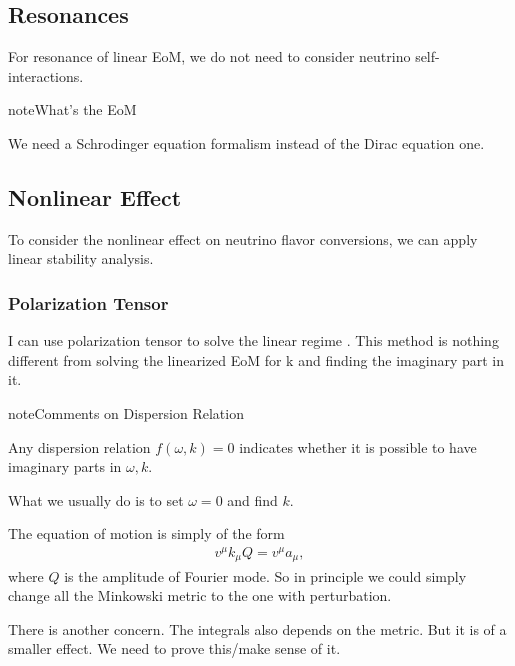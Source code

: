 \documentclass[letterpaper,12pt,english]{sphinxmanual}
\begin{document}
\subsection{Resonances}
\label{\detokenize{gravity/gravitational-waves:resonances}}
For resonance of linear EoM, we do not need to consider neutrino self-interactions.

\begin{sphinxadmonition}{note}{What's the EoM}

We need a Schrodinger equation formalism instead of the Dirac equation one.
\end{sphinxadmonition}


\subsection{Nonlinear Effect}
\label{\detokenize{gravity/gravitational-waves:nonlinear-effect}}
To consider the nonlinear effect on neutrino flavor conversions, we can apply linear stability analysis.


\subsubsection{Polarization Tensor}
\label{\detokenize{gravity/gravitational-waves:polarization-tensor}}
I can use polarization tensor to solve the linear regime \label{\detokenize{gravity/gravitational-waves:id10}}{\hyperref[\detokenize{gravity/gravitational-waves:izaguirre2017}]{\sphinxcrossref{{[}Izaguirre2017{]}}}}. This method is nothing different from solving the linearized EoM for k and finding the imaginary part in it.

\begin{sphinxadmonition}{note}{Comments on Dispersion Relation}

Any dispersion relation \(f(\omega,k)=0\) indicates whether it is possible to have imaginary parts in \(\omega,k\).

What we usually do is to set \(\omega=0\) and find \(k\).

The equation of motion is simply of the form
\begin{equation*}
\begin{split}v^\mu k_\mu Q = v^\mu a_\mu,\end{split}
\end{equation*}
where \(Q\) is the amplitude of Fourier mode. So in principle we could simply change all the Minkowski metric to the one with perturbation.

There is another concern. The integrals also depends on the metric. But it is of a smaller effect. We need to prove this/make sense of it.
\end{sphinxadmonition}
\end{document}
